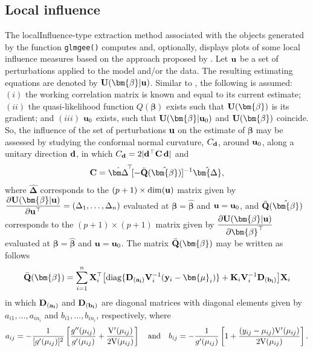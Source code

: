 \subsection{Local influence}
The localInfluence-type extraction method associated with the objects generated by the function {\tt glmgee()} computes and, optionally, displays plots of some local influence measures based on the approach proposed by \cite{C86}. Let ${\bf u}$ be a set of perturbations applied to the model and/or the data. The resulting estimating equations are denoted by ${\bf U}({\bm{\beta}}|{\bf u})$.
Similar to \cite{J08}, the following is assumed: $(i)$ the working correlation matrix is known and equal to its current estimate; $(ii)$ 
the quasi-likelihood function $Q(\bm{\beta})$ exists such that ${\bf U}({\bm{\beta}})$ is its gradient; and $(iii)$ ${\bf u}_0$ exists, such that ${\bf U}({\bm{\beta}}|{\bf u}_0)$ and ${\bf U}({\bm{\beta}})$ coincide. So, the influence of the set of perturbations ${\bf u}$ on the estimate of ${\bm{\beta}}$ may be assessed by studying the conformal normal curvature, $C_{\bf d}$, around ${\bf u}_0$, along a unitary direction ${\bf d}$, in which $C_{\bf d}=2|{\bf d^{\top}C\,d}|$ and 
\begin{equation*}
{\bf C}=  \hat{\bm \Delta}^{\!\top}\![-\ddot{\bf Q}(\hat{\bm {\beta}})]^{-1}\hat{\bm{\Delta}},
\end{equation*}
where $\hat{\bm{\Delta}}$ corresponds to the $(p+1)\times{\rm dim}({\bf u})$ matrix given by $\dfrac{\partial {\bf U}({\bm{\beta}}|{\bf u})}{\partial{\bf u}^{\top}}=(\Delta_1,\ldots,\Delta_n)$ evaluated at $\bm{\beta}=\hat{\bm{\beta}}$ and ${\bf u}={\bf u}_0$, and $\ddot{\bf Q}(\hat{\bm {\beta}})$
corresponds to the $(p+1)\times(p+1)$ matrix given by $\dfrac{\partial {\bf U}({\bm{\beta}}|{\bf u})}{\partial{\bm{\beta}}^{\top}}$
evaluated at $\bm{\beta}=\hat{\bm{\beta}}$ and ${\bf u}={\bf u}_0$. The matrix $\ddot{\bf Q}(\bm {\beta})$ may be written as follows
\begin{equation*}
\ddot{\bf Q}(\bm {\beta}) =\sum\limits_{i=1}^{n}{\bf{X}}_i^{\top}\!\left[{\rm diag}\{{\bf{D}}_{\bf (a_{i})}{\bf V} _{i}^{-1}({\bf y}_{i} - {\bm{\mu}_{i}})\} + {\bf K}_i{\bf V}_i^{-1}{\bf{D}}_{\bf (b_{i})}\right]\!{\bf X}_i
\end{equation*}
in which ${\bf{D}}_{\bf (a_{i})}$ and ${\bf{D}}_{\bf (b_{i})}$ are diagonal matrices with diagonal elements given by 
$a_{i1},\ldots,a_{in_i}$ and  $b_{i1},\ldots,b_{in_i}$, respectively, where
\begin{equation*}
a_{ij}=-\frac{1}{[g'(\mu_{ij})]^2}\left[ \frac{g''(\mu_{ij})}{g'(\mu_{ij})} + \frac{{\rm V}'(\mu_{ij})}{2{\rm V}(\mu_{ij})}\right]\quad {\rm and} \quad     
b_{ij}=-\frac{1}{g'(\mu_{ij})}\left[1 + \frac{(y_{ij} - \mu_{ij}) {\rm V}'(\mu_{ij})}{2{\rm V}(\mu_{ij})}\right].
\end{equation*}
